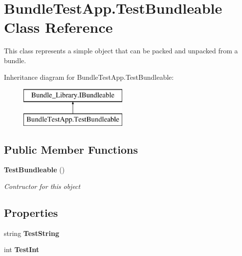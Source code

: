 \section{Bundle\+Test\+App.\+Test\+Bundleable Class Reference}
\label{class_bundle_test_app_1_1_test_bundleable}


This class represents a simple object that can be packed and unpacked from a bundle.  


Inheritance diagram for Bundle\+Test\+App.\+Test\+Bundleable\+:\begin{figure}[H]
\begin{center}
\leavevmode
\includegraphics[height=2.000000cm]{class_bundle_test_app_1_1_test_bundleable}
\end{center}
\end{figure}
\subsection*{Public Member Functions}
\begin{DoxyCompactItemize}
\item 
{\bf Test\+Bundleable} ()
\begin{DoxyCompactList}\small\item\em Contructor for this object \end{DoxyCompactList}\end{DoxyCompactItemize}
\subsection*{Properties}
\begin{DoxyCompactItemize}
\item 
string {\bfseries Test\+String}\hspace{0.3cm}{\ttfamily  [get, set]}\label{class_bundle_test_app_1_1_test_bundleable_a55581dd743dc0e109ec550468c6086b5}

\item 
int {\bfseries Test\+Int}\hspace{0.3cm}{\ttfamily  [get, set]}\label{class_bundle_test_app_1_1_test_bundleable_aa58c2d1ae230512695a927769c4c623e}

\end{DoxyCompactItemize}



